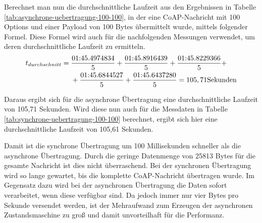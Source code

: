 Berechnet man nun die durchschnittliche Laufzeit aus den Ergebnissen in Tabelle \ref{tab:asynchrone-uebertragung-100-100}, in der eine CoAP-Nachricht mit 100 Options und einer Payload von 100 Bytes übermittelt wurde, mittels folgender Formel. Diese Formel wird auch für die nachfolgenden Messungen verwendet, um deren durchschnittliche Laufzeit zu ermitteln.
\begin{equation}
    \begin{aligned}
        t_{durchschnitt} ={} & \frac{\textnormal{01:45.4974834}}{5} + \frac{\textnormal{01:45.8916439}}{5} + \frac{\textnormal{01:45.8229366}}{5} + \\
        & + \frac{\textnormal{01:45.6844527}}{5} + \frac{\textnormal{01:45.6437280}}{5} = 105,71 \textnormal{Sekunden}
    \end{aligned}
\end{equation}

Daraus ergibt sich für die asynchrone Übertragung eine durchschnittliche Laufzeit von 105,71 Sekunden. Wird diese nun auch für die Messdaten in Tabelle \ref{tab:synchrone-uebertragung-100-100} berechnet, ergibt sich hier eine durchschnittliche Laufzeit von 105,61 Sekunden.

Damit ist die synchrone Übertragung um 100 Millisekunden schneller als die asynchrone Übertragung. Durch die geringe Datenmenge von 25813 Bytes für die gesamte Nachricht ist dies nicht überraschend. Bei der synchronen Übertragung wird so lange gewartet, bis die komplette CoAP-Nachricht übertragen wurde. Im Gegensatz dazu wird bei der asynchronen Übertragung die Daten sofort verarbeitet, wenn diese verfügbar sind. Da jedoch immer nur vier Bytes pro Sekunde versendet werden, ist der Mehraufwand zum Erzeugen der asynchronen Zustandsmaschine zu groß und damit unvorteilhaft für die Performanz.

\begin{table}[h]
    \caption{Synchrone Übertragung mit 100 Options und mit einer Payload von 100 Bytes.}
    \label{tab:synchrone-uebertragung-100-100}
\end{table}

